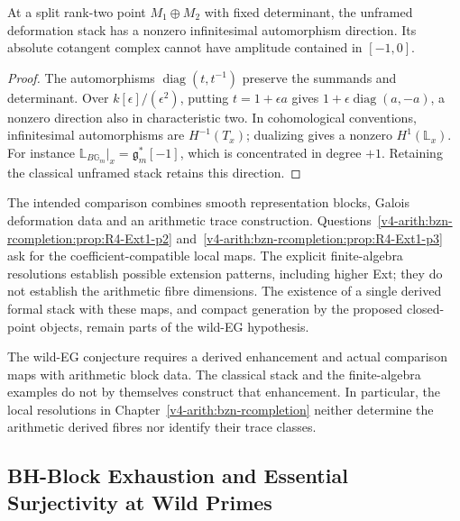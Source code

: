 \begin{lemma}
\label{v4-arith:deg-f1a:lem:stacky-cotangent-direction}
At a split rank-two point \(M_1\oplus M_2\) with fixed determinant,
the unframed deformation stack has a nonzero infinitesimal
automorphism direction. Its absolute cotangent complex cannot have
amplitude contained in \([-1,0]\).
\end{lemma}
\begin{proof}
The automorphisms \(\operatorname{diag}(t,t^{-1})\) preserve the
summands and determinant. Over \(k[\epsilon]/(\epsilon^2)\),
putting \(t=1+\epsilon a\) gives
\(1+\epsilon\operatorname{diag}(a,-a)\), a nonzero direction
also in characteristic two. In cohomological conventions,
infinitesimal automorphisms are \(H^{-1}(T_x)\); dualizing gives
a nonzero \(H^1(\mathbb L_x)\). For instance
\(\mathbb L_{B\mathbb G_m}|_x=\mathfrak g_m^*[-1]\), which is
concentrated in degree \(+1\). Retaining the classical unframed
stack retains this direction.
\end{proof}

\begin{remark}
\label{v4-arith:deg-f1a:rem:wild-EG-evidence}
The intended comparison combines smooth representation blocks,
Galois deformation data and an arithmetic trace construction.
Questions~\ref{v4-arith:bzn-rcompletion:prop:R4-Ext1-p2}
and~\ref{v4-arith:bzn-rcompletion:prop:R4-Ext1-p3} ask for the
coefficient-compatible local maps. The explicit finite-algebra
resolutions establish possible extension patterns, including higher
Ext; they do not establish the arithmetic fibre dimensions.
The existence of a single derived formal stack with these maps,
and compact generation by the proposed closed-point objects,
remain parts of the wild-EG hypothesis.
\end{remark}

\begin{remark}
\label{v4-arith:deg-f1a:rem:wild-EG-domain}
The wild-EG conjecture requires a derived enhancement and actual
comparison maps with arithmetic block data. The classical stack and
the finite-algebra examples do not by themselves construct that
enhancement. In particular, the local resolutions in
Chapter~\ref{v4-arith:bzn-rcompletion} neither determine the
arithmetic derived fibres nor identify their trace classes.
\end{remark}

\subsection{BH-Block Exhaustion and Essential Surjectivity at Wild Primes}


